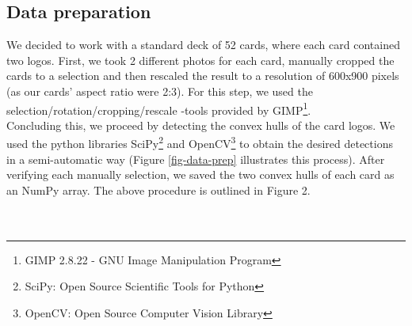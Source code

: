 \documentclass[a4paper]{article}
\begin{document}
\subsection*{Data preparation}
We decided to work with a standard deck of 52 cards, where each card contained two logos.  First, we took 2 different photos for each card, manually cropped the cards to a selection and then rescaled the result to a resolution of 600x900 pixels (as our cards' aspect ratio were 2:3).
For this step, we used the selection/rotation/cropping/rescale -tools provided by GIMP\footnote{GIMP 2.8.22 - GNU Image Manipulation Program}. \\
Concluding this, we proceed by detecting the convex hulls of the card logos. We used the python libraries SciPy\footnote{SciPy: Open Source Scientific Tools for Python} and OpenCV\footnote{OpenCV: Open Source Computer Vision Library} to obtain the desired detections in a semi-automatic way (Figure \ref{fig-data-prep} illustrates this process). After verifying each manually selection, we saved the two convex hulls of each card as an NumPy array. The above procedure is outlined in Figure 2.\\
\\ \\
\end{document}
